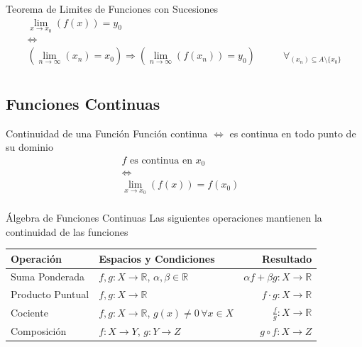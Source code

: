 \documentclass[a4paper,11pt]{article}
\begin{document}
\begin{definicion*}{Teorema de Limites de Funciones con Sucesiones}{}
  \begin{equation*}
    \begin{array}{cc}
      \lim_{x \to x_0}(f(x)) = y_0 &\\
      \Leftrightarrow&\\
      (\lim_{n \to \infty} (x_n) = x_0) \Rightarrow (\lim_{n \to \infty} (f(x_n)) = y_0) & \qquad \forall_{(x_n) \subseteq A \setminus \{x_0\}}\\
    \end{array}
  \end{equation*}
\end{definicion*}

\newpage

\subsection{Funciones Continuas}

\begin{definicion*}{Continuidad de una Función}{}
  Función continua $\Leftrightarrow$ es continua en todo punto de su dominio
  \begin{equation*}
    \begin{array}{cc}
      f \text{ es continua en } x_0 &\\
      \Leftrightarrow&\\
      \lim_{x \to x_0}(f(x)) = f(x_0) &\\
    \end{array}
  \end{equation*}
\end{definicion*}

\begin{definicion*}{Álgebra de Funciones Continuas}{}
  Las siguientes operaciones mantienen la continuidad de las funciones
  \begin{center}
    \begin{tabular}{l l r}
      \hline
      \textbf{Operación} & \textbf{Espacios y Condiciones} & \textbf{Resultado} \\
      \hline
      Suma Ponderada & $f,g:X \to \mathbb{R}$, $\alpha, \beta \in \mathbb{R}$ & $\alpha f + \beta g:X \to \mathbb{R}$ \\
      Producto Puntual & $f,g:X \to \mathbb{R}$ & $f \cdot g:X \to \mathbb{R}$ \\
      Cociente & $f,g:X \to \mathbb{R}$, $g(x) \neq 0 \, \forall x \in X$ & $\frac{f}{g}:X \to \mathbb{R}$ \\
      Composición & $f:X \to Y$, $g:Y \to Z$ & $g \circ f:X \to Z$ \\
      \hline
    \end{tabular}
  \end{center}
\end{definicion*}
\end{document}
